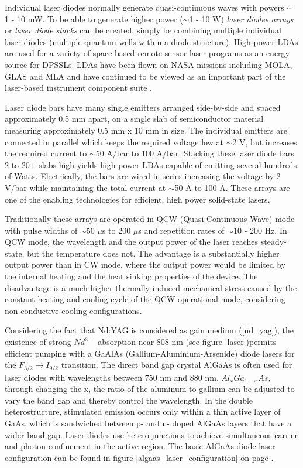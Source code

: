 Individual \acs{laser} diodes normally generate quasi-continuous waves with powers $\sim$ 1 - 10 mW. To be able to generate higher power ($\sim$1 - 10 W) \textit{laser diodes arrays} or \textit{laser diode stacks} can be created, simply be combining multiple individual \acs{laser} diodes (multiple quantum wells within a diode structure). High-power \acp{LDA} are used for a variety of space-based remote sensor laser programs as an energy source for \acp{DPSSL}. \acp{LDA} have been flown on NASA missions including MOLA, GLAS and MLA and have continued to be viewed as an important part of the \acs{laser}-based instrument component suite \cite{lda_main}. 

Laser diode bars have many single emitters arranged side-by-side and spaced approximately 0.5 mm apart, on a single slab of semiconductor material measuring approximately 0.5 mm x 10 mm in size. The individual emitters are connected in parallel which keeps the required voltage low at $\sim$2 V, but increases the required current to $\sim$50 A/bar to 100 A/bar. Stacking these laser diode bars 2 to 20+ slabs high yields high power \acp{LDA} capable of emitting several hundreds of Watts. Electrically, the bars are wired in series increasing the voltage by 2 V/bar while maintaining the total current at $\sim$50 A to 100 A. These arrays are one of the enabling technologies for efficient, high power solid-state lasers.

Traditionally these arrays are operated in QCW (Quasi Continuous Wave) mode with pulse widths of $\sim$50 $\mu$s to 200 $\mu$s and repetition rates of $\sim$10 - 200 Hz. In QCW mode, the wavelength and the output power of the laser reaches steady-state, but the temperature does not. The advantage is a substantially higher output power than in CW mode, where the output power would be limited by the internal heating and the heat sinking properties of the device. The disadvantage is a much higher thermally induced mechanical stress caused by the constant heating and cooling cycle of the QCW operational mode, considering non-conductive cooling configurations.

Considering the fact that Nd:YAG is considered as gain medium (\ref{nd_yag}), the existence of strong $Nd^{3+}$ absorption near 808 nm (see figure \ref{laser})permits efficient pumping with a GaAlAs (Gallium-Aluminium-Arsenide) diode \acp{laser} for the $F_{3/2}\rightarrow I_{9/2}$ transition. The direct band gap crystal AlGaAs is often used for laser diodes with wavelengths between 750 nm and 880 nm. $Al_{x}Ga_{1-x}As$, through changing the x, the ratio of the aluminum to gallium can be adjusted to vary the band gap and thereby control the wavelength. In the double heterostructure, stimulated emission occurs only within a thin active layer of GaAs, which is sandwiched between p- and n- doped AlGaAs layers that have a wider band gap. Laser diodes use hetero junctions to achieve simultaneous carrier and photon confinement in the active region. The basic AlGaAs diode \acs{laser} configuration can be found in figure \ref{algaas_laser_configuration} on page \pageref{algaas_laser_configuration}.

